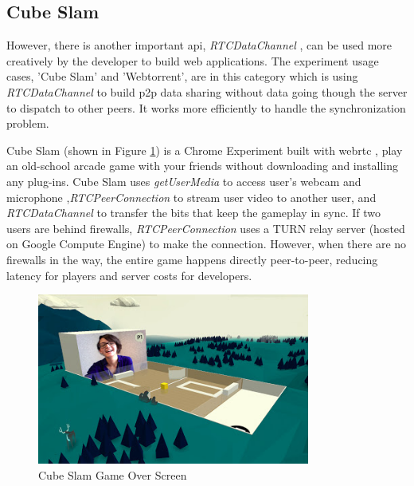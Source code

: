 \subsection{Cube Slam}

\noindent However, there is another important \gls{api}, \textit{RTCDataChannel} , can be used more creatively by the developer to build web applications. The experiment  usage cases, 'Cube Slam' and 'Webtorrent', are in this category which is using \textit{RTCDataChannel} to build \gls{p2p} data sharing without data going though the server to dispatch to other peers. It works more efficiently to handle the synchronization problem.

\par Cube Slam (shown in Figure \ref{fig:cube_slam}) is a Chrome Experiment built with \gls{webrtc} , play an old-school arcade game with your friends without downloading and installing any plug-ins. Cube Slam uses \textit{getUserMedia} to access user's webcam and microphone ,\textit{RTCPeerConnection} to stream user video to another user, and \textit{RTCDataChannel} to transfer the bits that keep the gameplay in sync. If two users are behind firewalls, \textit{RTCPeerConnection} uses a TURN  relay server (hosted on Google Compute Engine) to make the connection. However, when there are no firewalls in the way, the entire game happens directly peer-to-peer, reducing latency for players and server costs for developers.\cite{chrome:cube_slam}

\begin{figure}
	\centering
    	\includegraphics[width=0.8\textwidth,natwidth=610,natheight=642]{figs/cube_slam.jpg}
  	\caption{Cube Slam Game Over Screen}
  	\label{fig:cube_slam}
\end{figure}

